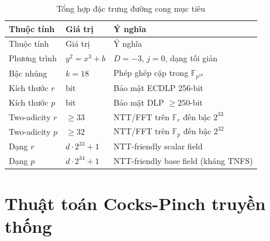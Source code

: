 \begin{longtable}[]{@{}
  >{\raggedright\arraybackslash}p{}
  >{\raggedright\arraybackslash}p{}
  >{\raggedright\arraybackslash}p{}@{}}
\caption{Tổng hợp đặc trưng đường cong mục tiêu}\tabularnewline
\toprule\noalign{}
\begin{minipage}[b]{\linewidth}\raggedright
Thuộc tính
\end{minipage} & \begin{minipage}[b]{\linewidth}\raggedright
Giá trị
\end{minipage} & \begin{minipage}[b]{\linewidth}\raggedright
Ý nghĩa
\end{minipage} \\
\midrule\noalign{}
\endfirsthead
\toprule\noalign{}
\begin{minipage}[b]{\linewidth}\raggedright
Thuộc tính
\end{minipage} & \begin{minipage}[b]{\linewidth}\raggedright
Giá trị
\end{minipage} & \begin{minipage}[b]{\linewidth}\raggedright
Ý nghĩa
\end{minipage} \\
\midrule\noalign{}
\endhead
\bottomrule\noalign{}
\endlastfoot
Phương trình & \(y^2 = x^3 + b\) & \(D=-3\), \(j=0\), dạng tối giản \\
Bậc nhúng & \(k = 18\) & Phép ghép cặp trong \(\mathbb{F}_{p^{18}}\) \\
Kích thước \(r\) & 512 bit & Bảo mật ECDLP 256-bit \\
Kích thước \(p\) & 1024 bit & Bảo mật DLP \(\geq 250\)-bit \\
Two-adicity \(r\) & \(\geq 33\) & NTT/FFT trên \(\mathbb{F}_r\) đến bậc
\(2^{33}\) \\
Two-adicity \(p\) & \(\geq 32\) & NTT/FFT trên \(\mathbb{F}_p\) đến bậc
\(2^{32}\) \\
Dạng \(r\) & \(d \cdot 2^{33} + 1\) & NTT-friendly scalar field \\
Dạng \(p\) & \(d \cdot 2^{34} + 1\) & NTT-friendly base field (kháng
TNFS) \\
\end{longtable}

\section{Thuật toán Cocks-Pinch truyền
thống}\label{thuux1eadt-touxe1n-cocks-pinch-truyux1ec1n-thux1ed1ng}

